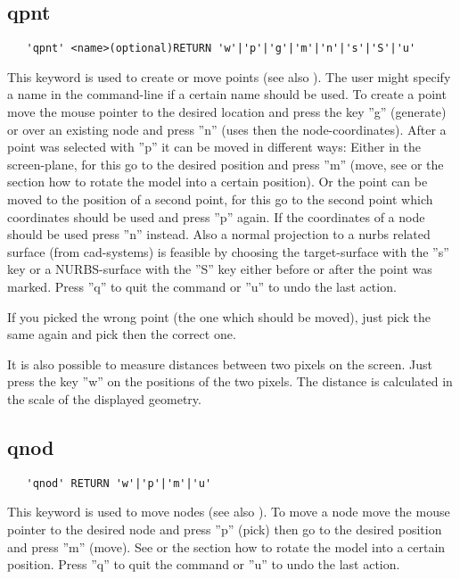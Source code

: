 \documentclass{article}
\begin{document}
\subsection{\label{qpnt}qpnt}
\begin{verbatim}
   'qpnt' <name>(optional)RETURN 'w'|'p'|'g'|'m'|'n'|'s'|'S'|'u'
\end{verbatim}
This keyword is used to create or move points (see also ). The user might specify a name in the command-line if a certain name should be used. To create a point move the mouse pointer to the desired location and press the key ''g'' (generate) or over an existing node and press ''n'' (uses then the node-coordinates). After a point was selected with ''p'' it can be moved in different ways: Either in the screen-plane, for this go to the desired position and press ''m'' (move, see  or the section  how to rotate the model into a certain position). Or the point can be moved to the position of a second point, for this go to the second point which coordinates should be used and press ''p'' again. If the coordinates of a node should be used press ''n'' instead. Also a normal projection to a nurbs related surface (from cad-systems) is feasible by choosing the target-surface with the ''s'' key or a NURBS-surface with the ''S'' key either before or after the point was marked. Press ''q'' to quit the command or ''u'' to undo the last action.

If you picked the wrong point (the one which should be moved), just pick the same again and pick then the correct one.

It is also possible to measure distances between two pixels on the screen. Just press the key ''w'' on the positions of the two pixels. The distance is calculated in the scale of the displayed geometry.  

\subsection{\label{qnod}qnod}
\begin{verbatim}
   'qnod' RETURN 'w'|'p'|'m'|'u'
\end{verbatim}
This keyword is used to move nodes (see also ). To move a node move the mouse pointer to the desired node and press ''p'' (pick) then go to the desired position and press ''m'' (move). See  or the section  how to rotate the model into a certain position. Press ''q'' to quit the command or ''u'' to undo the last action. 
\end{document}
